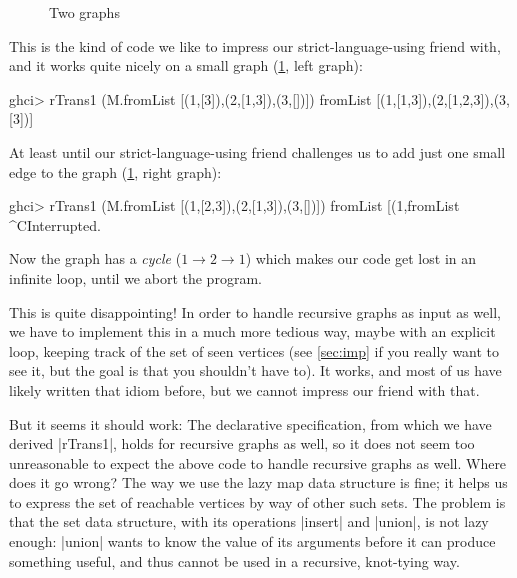 \documentclass[manuscript,screen,acmsmall,nonacm]{acmart}
\begin{document}
\begin{figure}
\centering
\hfill
\hfill
{}
\hfill
{}
\hfill
\hfill
\strut
\caption{Two graphs}\label{fig:graphs}
\end{figure}

This is the kind of code we like to impress our strict-language-using friend with, and it works quite nicely on a small graph (\cref{fig:graphs}, left graph):
\begin{code}
ghci> rTrans1 (M.fromList [(1,[3]),(2,[1,3]),(3,[])])
fromList [(1,[1,3]),(2,[1,2,3]),(3,[3])]
\end{code}
%
At least until our strict-language-using friend challenges us to add just one small edge to the graph (\cref{fig:graphs}, right graph):
\begin{code}
ghci> rTrans1 (M.fromList [(1,[2,3]),(2,[1,3]),(3,[])])
fromList [(1,fromList ^CInterrupted.
\end{code}
Now the graph has a \emph{cycle} ($1 \to 2 \to 1$) which makes our code get lost in an infinite loop, until we abort the program.

This is quite disappointing! In order to handle recursive graphs as input as well, we have to implement this in a much more tedious way, maybe with an explicit loop, keeping track of the set of seen vertices (see \cref{sec:imp} if you really want to see it, but the goal is that you shouldn’t have to). It works, and most of us have likely written that idiom before, but we cannot impress our friend with that.

But it seems it should work: The declarative specification, from which we have derived |rTrans1|, holds for recursive graphs as well, so it does not seem too unreasonable to expect the above code to handle recursive graphs as well. Where does it go wrong? The way we use the lazy map data structure is fine; it helps us to express the set of reachable vertices by way of other such sets.
The problem is that the set data structure, with its operations |insert| and |union|, is not lazy enough: |union| wants to know the value of its arguments before it can produce something useful, and thus cannot be used in a recursive, knot-tying way.
\end{document}
